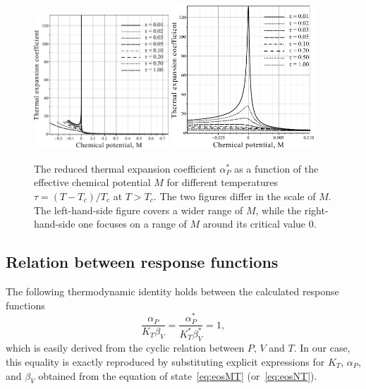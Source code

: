 \begin{figure}[h!]
	\centering \includegraphics[width=0.45\textwidth]{f4b.pdf}
	\includegraphics[width=0.475\textwidth]{f4c.pdf}
	\vskip-3mm\caption{The reduced thermal expansion coefficient $\alpha^*_P$ as a function of the effective chemical potential $M$ for different temperatures $\tau = (T - T_c)/T_c$ at $T > T_c$. The two figures differ in the scale of $M$. The left-hand-side figure covers a wider range of $M$, while the right-hand-side one focuses on a range of $M$ around its critical value $0$.
	}\label{fig4b}
\end{figure}

\subsection{Relation between response functions}
The following thermodynamic identity holds between the calculated response functions
\begin{equation}
	\label{eq:identity}
	\frac{\alpha_P}{K_T \beta_V} = \frac{\alpha^*_P}{K^*_T \beta^*_V} = 1,
\end{equation}
which is easily derived from the cyclic relation between $P$, $V$ and $T$. In our case, this equality is exactly reproduced by substituting explicit expressions for $K_T$, $\alpha_P$, and $\beta_V$ obtained from the equation of state~\eqref{eq:eosMT} (or~\eqref{eq:eosNT}). 

